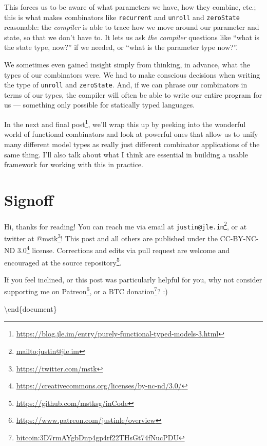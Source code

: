 \documentclass[]{article}
\renewcommand{\href}[2]{#2\footnote{\url{#1}}}
\begin{document}
\begin{enumerate}
  This forces us to be aware of what parameters we have, how they combine, etc.;
  this is what makes combinators like \texttt{recurrent} and \texttt{unroll} and
  \texttt{zeroState} reasonable: the \emph{compiler} is able to trace how we
  move around our parameter and state, so that we don't have to. It lets us ask
  \emph{the compiler} questions like ``what is the state type, now?'' if we
  needed, or ``what is the parameter type now?''.

  We sometimes even gained insight simply from thinking, in advance, what the
  types of our combinators were. We had to make conscious decisions when writing
  the type of \texttt{unroll} and \texttt{zeroState}. And, if we can phrase our
  combinators in terms of our types, the compiler will often be able to write
  our entire program for us --- something only possible for statically typed
  languages.
\end{enumerate}

In the
\href{https://blog.jle.im/entry/purely-functional-typed-models-3.html}{next and
final post}, we'll wrap this up by peeking into the wonderful world of
functional combinators and look at powerful ones that allow us to unify many
different model types as really just different combinator applications of the
same thing. I'll also talk about what I think are essential in building a usable
framework for working with this in practice.

\section{Signoff}\label{signoff}

Hi, thanks for reading! You can reach me via email at
\href{mailto:justin@jle.im}{\nolinkurl{justin@jle.im}}, or at twitter at
\href{https://twitter.com/mstk}{@mstk}! This post and all others are published
under the \href{https://creativecommons.org/licenses/by-nc-nd/3.0/}{CC-BY-NC-ND
3.0} license. Corrections and edits via pull request are welcome and encouraged
at \href{https://github.com/mstksg/inCode}{the source repository}.

If you feel inclined, or this post was particularly helpful for you, why not
consider \href{https://www.patreon.com/justinle/overview}{supporting me on
Patreon}, or a \href{bitcoin:3D7rmAYgbDnp4gp4rf22THsGt74fNucPDU}{BTC donation}?
:)

\textbackslash end\{document\}
\end{document}
